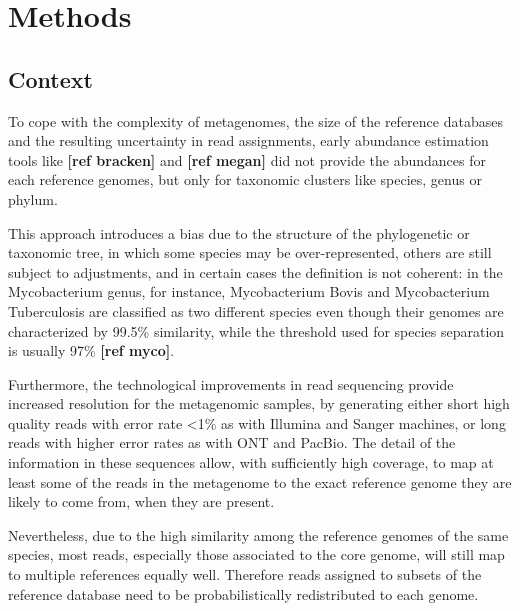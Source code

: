 
\chapter{Methods} %
\label{Chapter3}

\section{Context}

To cope with the complexity of metagenomes, the size of the reference databases and the resulting uncertainty in read assignments, early abundance estimation tools like \textbf{[ref bracken]} and \textbf{[ref megan]} did not provide the abundances for each reference genomes, but only for taxonomic clusters like species, genus or phylum.

This approach introduces a bias due to the structure of the phylogenetic or taxonomic tree, in which some species may be over-represented, others are still subject to adjustments, and in certain cases the definition is not coherent: in the Mycobacterium genus, for instance, Mycobacterium Bovis and Mycobacterium Tuberculosis are classified as two different species even though their genomes are characterized by 99.5\% similarity, while the threshold used for species separation is usually 97\% \textbf{[ref myco]}.

Furthermore, the technological improvements in read sequencing provide increased resolution for the metagenomic samples, by generating either short high quality reads with error rate <1\% as with Illumina and Sanger machines, or long reads with higher error rates as with ONT and PacBio. The detail of the information in these sequences allow, with sufficiently high coverage, to map at least some of the reads in the metagenome to the exact reference genome they are likely to come from, when they are present.

Nevertheless, due to the high similarity among the reference genomes of the same species, most reads, especially those associated to the core genome, will still map to multiple references equally well. Therefore reads assigned to subsets of the reference database need to be probabilistically redistributed to each genome.

